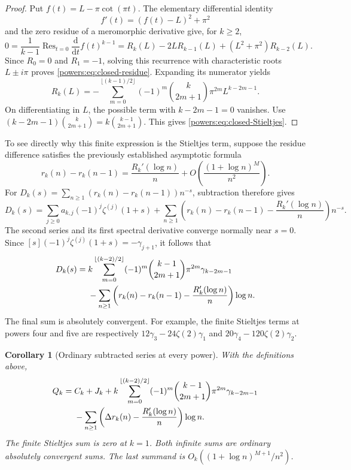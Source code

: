 \documentclass[11pt,a4paper]{article}
\numberwithin{equation}{section}
\newtheorem{corollary}[theorem]{Corollary}
\theoremstyle{definition}
\theoremstyle{remark}
\DeclareMathOperator*{\Res}{Res}
\newcommand{\dd}{\mathrm d}
\begin{document}
\begin{proof}
Put \(f(t)=L-\pi\cot(\pi t)\). The elementary differential
identity
\[
 f'(t)=(f(t)-L)^2+\pi^2
\]
and the zero residue of a meromorphic derivative give, for \(k\ge2\),
\[
 0=\frac1{k-1}\Res_{t=0}\frac{\dd}{\dd t}f(t)^{k-1}
   =R_k(L)-2LR_{k-1}(L)+(L^2+\pi^2)R_{k-2}(L).
\]
Since \(R_0=0\) and \(R_1=-1\), solving this recurrence with
characteristic roots \(L\pm i\pi\) proves
\eqref{powers:eq:closed-residue}. Expanding its numerator yields
\[
 R_k(L)=-\sum_{m=0}^{\lfloor(k-1)/2\rfloor}
       (-1)^m\binom{k}{2m+1}\pi^{2m}L^{k-2m-1}.
\]
On differentiating in \(L\), the possible term with
\(k-2m-1=0\) vanishes. Use
\((k-2m-1)\binom{k}{2m+1}=k\binom{k-1}{2m+1}\).
This gives \eqref{powers:eq:closed-Stieltjes}.
\end{proof}

To see directly why this finite expression is the Stieltjes term,
suppose the residue difference satisfies the previously established
asymptotic formula
\[
 r_k(n)-r_k(n-1)
   =\frac{R_k'(\log n)}n
          +O\!\left(\frac{(1+\log n)^M}{n^2}\right).
\]
For \(D_k(s)=\sum_{n\ge1}(r_k(n)-r_k(n-1))n^{-s}\), subtraction
therefore gives
\[
 D_k(s)=\sum_{j\ge0}a_{k,j}(-1)^j\zeta^{(j)}(1+s)
 +\sum_{n\ge1}
   \left(r_k(n)-r_k(n-1)-\frac{R_k'(\log n)}n\right)n^{-s}.
\]
The second series and its first spectral derivative converge normally
near \(s=0\). Since
\([s](-1)^j\zeta^{(j)}(1+s)=-\gamma_{j+1}\), it follows that
\begin{align}
 [s]D_k(s)
 ={}&k\sum_{m=0}^{\lfloor(k-2)/2\rfloor}
       (-1)^m\binom{k-1}{2m+1}\pi^{2m}\gamma_{k-2m-1}
       \notag\\
 &-\sum_{n\ge1}
   \left(r_k(n)-r_k(n-1)-\frac{R_k'(\log n)}n\right)\log n.
 \label{powers:eq:closed-Dlinear}
\end{align}
The final sum is absolutely convergent. For example, the finite
Stieltjes terms at powers four and five are respectively
\(12\gamma_3-24\zeta(2)\gamma_1\) and
\(20\gamma_4-120\zeta(2)\gamma_2\).


\begin{corollary}[Ordinary subtracted series at every power]
\label{cor:ordinary-all}
With the definitions above,
\begin{align}
 Q_k={}&C_k+J_k+
 k\sum_{m=0}^{\lfloor(k-2)/2\rfloor}
       (-1)^m\binom{k-1}{2m+1}\pi^{2m}\gamma_{k-2m-1}
 \notag\\
 &-\sum_{n\ge1}
   \left(\Delta r_k(n)-\frac{R_k'(\log n)}n\right)\log n.
 \label{eq:ordinary-all}
\end{align}
The finite Stieltjes sum is zero at $k=1$.  Both infinite sums are
ordinary absolutely convergent sums.  The last summand is
$O_k((1+\log n)^{M+1}/n^2)$.
\end{corollary}
\end{document}
